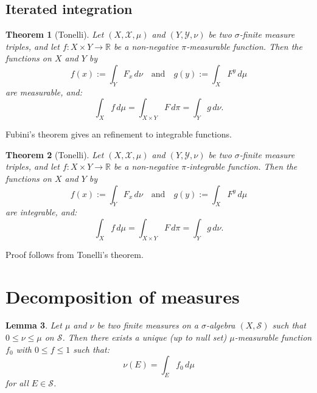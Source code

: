 \documentclass{article}
\newtheorem{theorem}{Theorem}
\newtheorem{lemma}[theorem]{Lemma}
\theoremstyle{definition}
\numberwithin{theorem}{section}
\numberwithin{equation}{section}
\begin{document}
\subsection{Iterated integration}
\begin{theorem}[Tonelli]
	Let $(X, \mathcal{X}, \mu)$ and $(Y, \mathcal{Y}, \nu)$ be two $\sigma$-finite measure triples, and let $f: X \times Y \rightarrow \mathbb{R}$ be a non-negative $\pi$-measurable function. Then the functions on $X$ and $Y$ by
	\begin{equation}
		f(x) := \int_Y F_x \, d\nu \quad \text{and} \quad g(y) := \int_X F^y \, d\mu
	\end{equation}
are measurable, and:
\begin{equation}
	\int_X f \, d\mu = \int_{X \times Y} F \, d\pi = \int_Y g \, d\nu.
\end{equation}
\end{theorem}
Fubini's theorem gives an refinement to integrable functions. 
\begin{theorem}[Tonelli]
	Let $(X, \mathcal{X}, \mu)$ and $(Y, \mathcal{Y}, \nu)$ be two $\sigma$-finite measure triples, and let $f: X \times Y \rightarrow \mathbb{R}$ be a non-negative $\pi$-integrable function. Then the functions on $X$ and $Y$ by
	\begin{equation}
		f(x) := \int_Y F_x \, d\nu \quad \text{and} \quad g(y) := \int_X F^y \, d\mu
	\end{equation}
	are integrable, and:
	\begin{equation}
		\int_X f \, d\mu = \int_{X \times Y} F \, d\pi = \int_Y g \, d\nu.
	\end{equation}
\end{theorem}
Proof follows from Tonelli's theorem. 

\section{Decomposition of measures}

\begin{lemma}
	Let $\mu$ and $\nu$ be two finite measures on a $\sigma$-algebra $(X, \mathcal{S})$ such that $0 \leq \nu \leq \mu$ on $\mathcal{S}$. Then there exists a unique (up to null set) $\mu$-measurable function $f_0$ with $0 \leq f \leq 1$ such that:
	\begin{equation}
		\nu(E) = \int_E f_0 \, d\mu
	\end{equation}
	for all $E \in \mathcal{S}$. 
\end{lemma}
\end{document}
